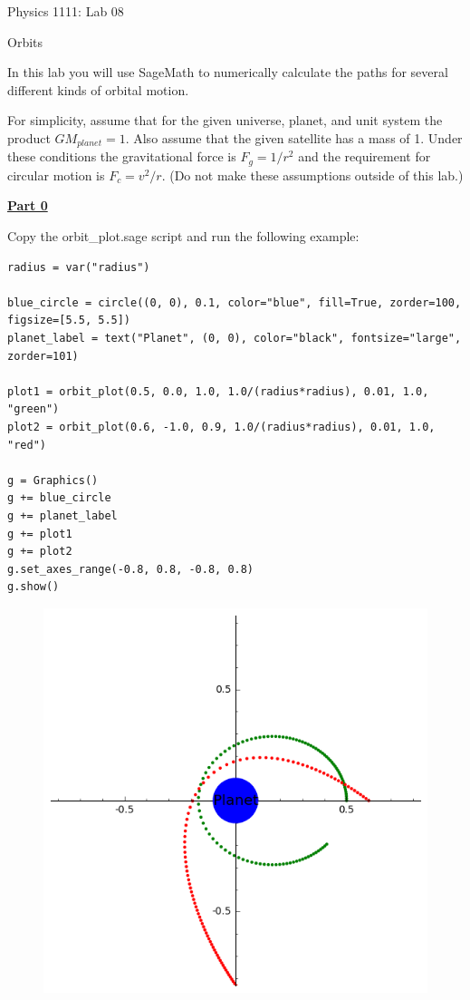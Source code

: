\documentclass[12pt]{article}
\begin{document}
{\centering
\large Physics 1111: Lab 08 \par
\large Orbits \par
}
\hfill \break \vspace{-4mm}

In this lab you will use SageMath to numerically calculate the paths for several different kinds of orbital motion.
\hfill \break

For simplicity, assume that for the given universe, planet, and unit system the product $GM_{planet} = 1$.
Also assume that the given satellite has a mass of 1.
Under these conditions the gravitational force is $F_g = 1/r^2$ and the requirement for circular motion is $F_c = v^2/r$.
(Do not make these assumptions outside of this lab.)
\hfill \break

\underline{\textbf{Part 0}} \par
Copy the orbit\_plot.sage script and run the following example:
\begin{verbatim}
radius = var("radius")

blue_circle = circle((0, 0), 0.1, color="blue", fill=True, zorder=100, figsize=[5.5, 5.5])
planet_label = text("Planet", (0, 0), color="black", fontsize="large", zorder=101)

plot1 = orbit_plot(0.5, 0.0, 1.0, 1.0/(radius*radius), 0.01, 1.0, "green")
plot2 = orbit_plot(0.6, -1.0, 0.9, 1.0/(radius*radius), 0.01, 1.0, "red")

g = Graphics()
g += blue_circle
g += planet_label
g += plot1
g += plot2
g.set_axes_range(-0.8, 0.8, -0.8, 0.8)
g.show()
\end{verbatim}
%
\begin{figure}[H]
\includegraphics[scale=0.60]{figures/part0.png}
\end{figure}
\end{document}

